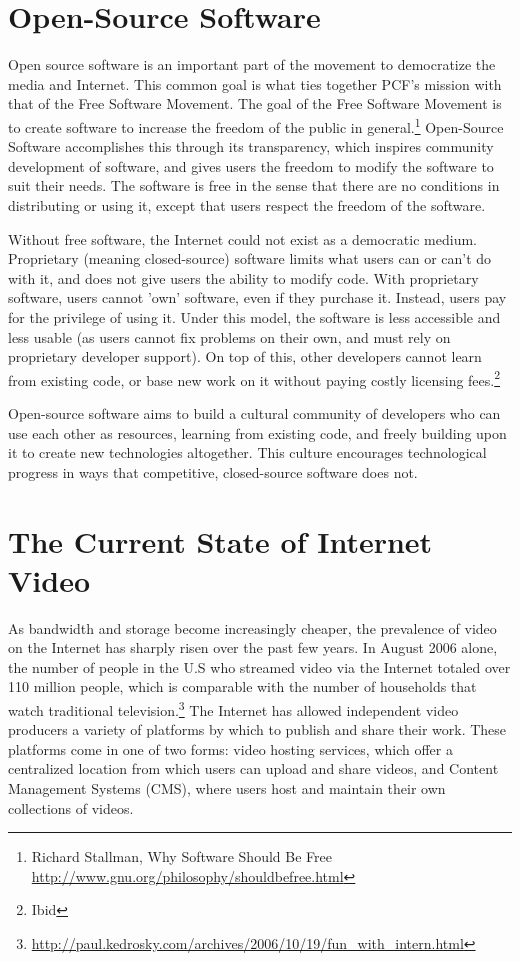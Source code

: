 \documentclass[a4paper,12pt]{report}
\begin{document}
\section{Open-Source Software}
Open source software is an important part of the movement to democratize the media and Internet. 
This common goal is what ties together PCF's mission with that of the Free Software Movement. 
The goal of the Free Software Movement is to create software to increase the freedom of the public in general.\footnote{Richard Stallman, Why Software Should Be Free \url{http://www.gnu.org/philosophy/shouldbefree.html}}
Open-Source Software accomplishes this through its transparency, which inspires community development of software, and gives users the freedom to modify the software to suit their needs.
The software is free in the sense that there are no conditions in distributing or using it, except that users respect the freedom of the software.

Without free software, the Internet could not exist as a democratic medium.
Proprietary (meaning closed-source) software limits what users can or can't do with it, and does not give users the ability to modify code.
With proprietary software, users cannot 'own' software, even if they purchase it.
Instead, users pay for the privilege of using it.
Under this model, the software is less accessible and less usable (as users cannot fix problems on their own, and must rely on proprietary developer support).
On top of this, other developers cannot learn from existing code, or base new work on it without paying costly licensing fees.\footnote{Ibid} 


Open-source software aims to build a cultural community of developers who can use each other as resources, learning from existing code, and freely building upon it to create new technologies altogether.
This culture encourages technological progress in ways that competitive, closed-source software does not. 

\section{The Current State of Internet Video}
As bandwidth and storage become increasingly cheaper, the prevalence of video on the Internet has sharply risen over the past few years. 
In August 2006 alone, the number of people in the U.S who streamed video 
via the Internet totaled over 110 million people, which is comparable 
with the number of households that watch traditional television.\footnote{\url{http://paul.kedrosky.com/archives/2006/10/19/fun\_with\_intern.html}}
The Internet has allowed independent video producers a variety of platforms by which to publish and share their work. These platforms come 
in one of two forms: video hosting services, which offer a centralized location from which users can upload and share videos, and Content Management Systems (CMS), where users host and maintain their own collections of videos.
\end{document}

